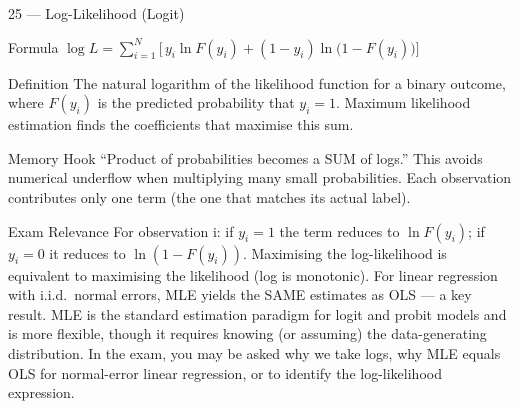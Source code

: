 \documentclass[aspectratio=169,8pt]{beamer}
\begin{document}
	\begin{frame}{25 --- Log-Likelihood (Logit)}
		\begin{block}{Formula}
			$\log L = \sum_{i=1}^{N}\big[\,y_i \ln F(y_i) + (1 - y_i)\ln\!\big(1 - F(y_i)\big)\big]$
		\end{block}
		\begin{block}{Definition}
			The natural logarithm of the likelihood function for a binary outcome, where $F(y_i)$ is the predicted probability that $y_i = 1$. Maximum likelihood estimation finds the coefficients that maximise this sum.
		\end{block}
		\begin{block}{Memory Hook}
			``Product of probabilities becomes a SUM of logs.'' This avoids numerical underflow when multiplying many small probabilities. Each observation contributes only one term (the one that matches its actual label).
		\end{block}
		\begin{block}{Exam Relevance}
			For observation i: if $y_i = 1$ the term reduces to $\ln F(y_i)$; if $y_i = 0$ it reduces to $\ln(1 - F(y_i))$. Maximising the log-likelihood is equivalent to maximising the likelihood (log is monotonic). For linear regression with i.i.d.\ normal errors, MLE yields the SAME estimates as OLS --- a key result. MLE is the standard estimation paradigm for logit and probit models and is more flexible, though it requires knowing (or assuming) the data-generating distribution. In the exam, you may be asked why we take logs, why MLE equals OLS for normal-error linear regression, or to identify the log-likelihood expression.
		\end{block}
	\end{frame}
	
\end{document}
